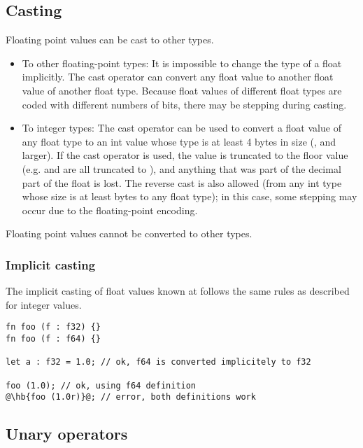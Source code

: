 \subsection{Casting}
\label{sec:org9eacb07}

Floating point values can be cast to other types.

\begin{itemize}
  \setlength\itemsep{-4pt}
\item To other floating-point types: It is impossible to change the type of a
  float implicitly. The cast operator  can convert any float
  value to another float value of another float type. Because float values of
  different float types are coded with different numbers of bits, there may be
  stepping during casting.

\item To integer types: The cast operator can be used to convert a float value
  of any float type to an int value whose type is at least 4 bytes in size
  (,  and larger). If the cast operator is used, the
  value is truncated to the floor value (e.g.   and
   are all truncated to ), and anything that was part of
  the decimal part of the float is lost. The reverse cast is also allowed (from
  any int type whose size is at least  bytes to any float type); in
  this case, some stepping may occur due to the floating-point encoding.

\end{itemize}

Floating point values cannot be converted to other types.
\subsubsection{Implicit casting}

The implicit casting of float values known at  follows the same
rules as described for integer  values.

\begin{lstlisting}[style=coloredverbatim, escapechar=@]
fn foo (f : f32) {}
fn foo (f : f64) {}

let a : f32 = 1.0; // ok, f64 is converted implicitely to f32

foo (1.0); // ok, using f64 definition
@\hb{foo (1.0r)}@; // error, both definitions work
\end{lstlisting}

\subsection{Unary operators}
\label{sec:org30770bf}

